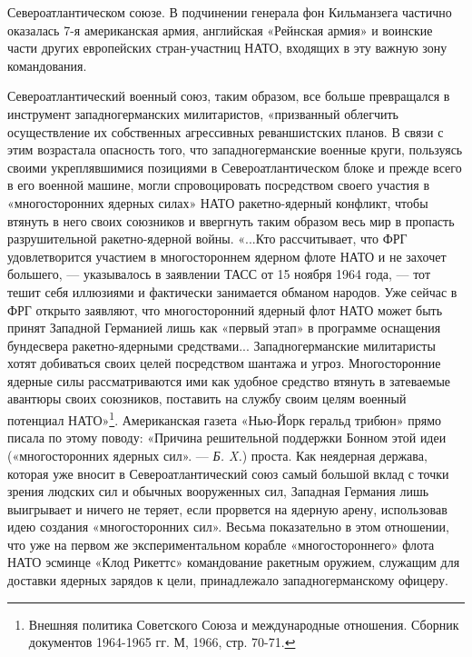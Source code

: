 \documentclass[12pt, a4paper, openany]{book}
\begin{document}
Североатлантическом союзе. В подчинении генерала фон Кильманзега частично оказалась 7-я американская армия, английская «Рейнская армия» и воинские части других европейских стран-участниц НАТО, входящих в эту важную зону командования.
	
	Североатлантический военный союз, таким образом, все больше превращался в инструмент западногерманских милитаристов, «призванный облегчить осуществление их собственных агрессивных реваншистских планов. В связи с этим возрастала опасность того, что западногерманские военные круги, пользуясь своими укреплявшимися позициями в Североатлантическом блоке и прежде всего в его военной машине, могли спровоцировать посредством своего участия в «многосторонних ядерных силах» НАТО ракетно-ядерный конфликт, чтобы втянуть в него своих союзников и ввергнуть таким образом весь мир в пропасть разрушительной ракетно-ядерной войны. «...Кто рассчитывает, что ФРГ удовлетворится участием в многостороннем ядерном флоте НАТО и не захочет большего, — указывалось в заявлении ТАСС от 15 ноября 1964 года, — тот тешит себя иллюзиями и фактически занимается обманом народов. Уже сейчас в ФРГ открыто заявляют, что многосторонний ядерный флот НАТО может быть принят Западной Германией лишь как «первый этап» в программе оснащения бундесвера ракетно-ядерными средствами... Западногерманские милитаристы хотят добиваться своих целей посредством шантажа и угроз. Многосторонние ядерные силы рассматриваются ими как удобное средство втянуть в затеваемые авантюры своих союзников, поставить на службу своим целям военный потенциал НАТО»{\footnote{Внешняя политика Советского Союза и международные отношения. Сборник документов 1964-1965 гг. М, 1966, стр. 70-71.}}. Американская газета «Нью-Йорк геральд трибюн» прямо писала по этому поводу: «Причина решительной поддержки Бонном этой идеи («многосторонних ядерных сил». — \textit{Б. X.}) проста. Как неядерная держава, которая уже вносит в Североатлантический союз самый большой вклад с точки зрения людских сил и обычных вооруженных сил, Западная Германия лишь выигрывает и ничего не теряет, если прорвется на ядерную арену, использовав идею создания «многосторонних сил». Весьма показательно в этом отношении, что уже на первом же экспериментальном корабле «многостороннего» флота НАТО эсминце «Клод Рикеттс» командование ракетным оружием, служащим для доставки ядерных зарядов к цели, принадлежало западногерманскому офицеру.
	
	
	
\end{document}
